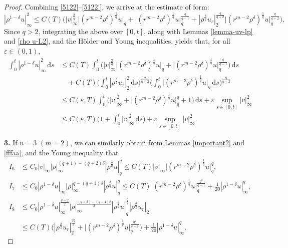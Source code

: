 \documentclass[11pt,reqno]{amsart}
\numberwithin{rk}{section}
\numberwithin{prop}{section}
\numberwithin{mydef}{section}
\numberwithin{lem}{section}
\numberwithin{equation}{section}
\numberwithin{thm}{section}
\begin{document}
\begin{proof}
Combining \eqref{5122}--\eqref{5122'}, we arrive at the estimate of form:
\begin{equation*}
|\rho^{1-\delta}u|_\infty^2\leq C(T)\Big(|v|_\infty^\frac{2}{q}\big|(r^{m-2}\rho^\delta)^\frac{1}{q}u\big|_q+\big|(r^{m-2}\rho^\delta)^\frac{1}{q}u\big|_q^\frac{q}{q-1}+|\rho^\frac{\delta}{2}u_r|_2^\frac{4}{q+2}\big|(r^{m-2}\rho^\delta)^\frac{1}{q}u\big|_q^\frac{q}{q+2}\Big).
\end{equation*}
Since $q>2$, integrating the above over $[0,t]$, along with Lemmas \ref{lemma-uv-lp} and \ref{rho u-L2}, and the H\"older and Young inequalities, yields that, for all $\varepsilon\in (0,1)$,
\begin{equation*}
\begin{aligned}
\int_0^t |\rho^{1-\delta}u|_\infty^2\,\mathrm{d}s&\leq C(T)\int_0^t\Big(|v|_\infty^\frac{2}{q}\big|(r^{m-2}\rho^\delta)^\frac{1}{q}u\big|_q+\big|(r^{m-2}\rho^\delta)^\frac{1}{q}u\big|_q^\frac{q}{q-1}\Big)\,\mathrm{d}s\\
&\quad +C(T)\Big(\int_0^t |\rho^\frac{\delta}{2}u_r|_2^2\,\mathrm{d}s\Big)^\frac{2}{q+2}\Big(\int_0^t \big|(r^{m-2}\rho^\delta)^\frac{1}{q}u\big|_q \,\mathrm{d}s\Big)^\frac{q}{q+2}\\
&\leq C(\varepsilon,T)\int_0^t \big(|v|_\infty^2 +\big|(r^{m-2}\rho^\delta)^\frac{1}{q}u\big|_q^q+1\big)\,\mathrm{d}s +\varepsilon\sup_{s\in[0,t]}|v|_\infty^2\\
&\leq C(\varepsilon,T)\Big(1+ \int_0^t |v|_\infty^2\,\mathrm{d}s\Big)+\varepsilon \sup_{s\in[0,t]}|v|_\infty^2.
\end{aligned}
\end{equation*}

\smallskip
\textbf{3.} If $n=3$ $(m=2)$, we can similarly obtain from Lemmas \ref{important2} and \ref{fffaa}, and the Young inequality that
\begin{equation}\label{5123}
\begin{aligned}
I_6&\leq C_0|v|_\infty|\rho|_\infty^{(q+1)-(q+2)\delta}|\rho^{\frac{\delta}{q}}u|_{q}^{q}\leq C(T) |v|_\infty\big|(r^{m-2}\rho^\delta)^\frac{1}{q}u\big|_q^{q}, \\
I_7&\leq C_0|\rho^{1-\delta}u|_\infty|\rho|_\infty^{q-(q+1)\delta}|\rho^{\frac{\delta}{q}}u|_{q}^{q}\leq C(T)\big|(r^{m-2}\rho^\delta)^\frac{1}{q}u\big|_q^\frac{q^2}{q-1}+\frac{1}{20}|\rho^{1-\delta}u|_\infty^{q},\\
I_{8}&\leq C_0|\rho^{1-\delta}u|_\infty^\frac{q-2}{2}|\rho|_\infty^{\frac{(q+2)-(q+4)\delta}{2}}|\rho^{\frac{\delta}{q}}u|_{q}^\frac{q}{2}|\rho^\frac{\delta}{2}u_r|_2\\
&\leq C(T)\big(|\rho^\frac{\delta}{2}u_r|_2^{\frac{2q}{3}}+\big|(r^{m-2}\rho^\delta)^\frac{1}{q}u\big|_q^\frac{q^2}{q-1}\big) +\frac{1}{20}|\rho^{1-\delta}u|_\infty^{q}.
\end{aligned}
\end{equation}
 

\end{proof}
\end{document}
